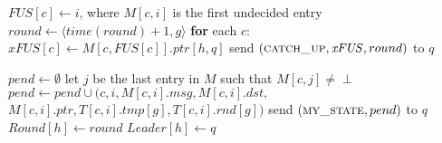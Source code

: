 \begin{algorithm}[t]
\footnotesize

\begin{distribalgo}[1]

		\STATE $\mathit{FUS}[c] \leftarrow i$, where $M[c,i]$ is the first undecided entry %
	\ENDFOR
	\STATE $round \leftarrow \langle time(round)+1,g \rangle$
			\STATE \textbf{for} each $c$: $\mathit{xFUS}[c] \leftarrow M[c,\mathit{FUS}[c]].ptr[h,q]$
			\STATE \textsf{send} $(\textsc{catch\_up}, \mathit{xFUS}, round)$ to $q$
		\ENDINDENT
	\ENDINDENT
\ENDWHEN

\vspace{2.0mm}
		\STATE $pend \leftarrow \emptyset$
			\STATE let $j$ be the last entry in $M$ such that $M[c,j] \neq \perp$
					\STATE $pend \leftarrow pend \cup (c,i,M[c,i].msg,M[c,i].dst,$ \\ 
						\hfill $M[c,i].ptr,T[c,i].tmp[g],T[c,i].rnd[g])$
				\ENDIF
			\ENDFOR
		\ENDFOR
		\STATE \textsf{send} $(\textsc{my\_state},pend)$ to $q$
		\STATE $Round[h] \leftarrow round$
		\STATE $Leader[h] \leftarrow q$
\ENDWHEN


\end{distribalgo}
\end{algorithm}
